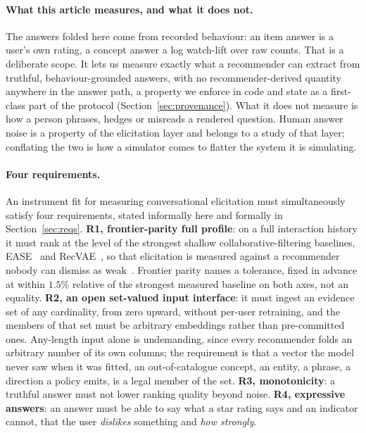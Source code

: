 \documentclass[acmsmall,review,anonymous]{acmart}
\begin{document}
\paragraph{What this article measures, and what it does not.} The answers folded here come from recorded behaviour: an item answer is a user's own rating, a concept answer a log watch-lift over raw counts. That is a deliberate scope. It lets us measure exactly what a recommender can extract from truthful, behaviour-grounded answers, with no recommender-derived quantity anywhere in the answer path, a property we enforce in code and state as a first-class part of the protocol (Section~\ref{sec:provenance}). What it does not measure is how a person phrases, hedges or misreads a rendered question. Human answer noise is a property of the elicitation layer and belongs to a study of that layer; conflating the two is how a simulator comes to flatter the system it is simulating.

\paragraph{Four requirements.} An instrument fit for measuring conversational elicitation must simultaneously satisfy four requirements, stated informally here and formally in Section~\ref{sec:reqs}. \textbf{R1, frontier-parity full profile}: on a full interaction history it must rank at the level of the strongest shallow collaborative-filtering baselines, EASE~\citep{steck2019ease} and RecVAE~\citep{ren2020recvae}, so that elicitation is measured against a recommender nobody can dismiss as weak~\citep{dacrema2019progress}. Frontier parity names a tolerance, fixed in advance at within $1.5\%$ relative of the strongest measured baseline on both axes, not an equality. \textbf{R2, an open set-valued input interface}: it must ingest an evidence set of any cardinality, from zero upward, without per-user retraining, and the members of that set must be arbitrary embeddings rather than pre-committed ones. Any-length input alone is undemanding, since every recommender folds an arbitrary number of its own columns; the requirement is that a vector the model never saw when it was fitted, an out-of-catalogue concept, an entity, a phrase, a direction a policy emits, is a legal member of the set. \textbf{R3, monotonicity}: a truthful answer must not lower ranking quality beyond noise. \textbf{R4, expressive answers}: an answer must be able to say what a star rating says and an indicator cannot, that the user \emph{dislikes} something and \emph{how strongly}.
\end{document}
